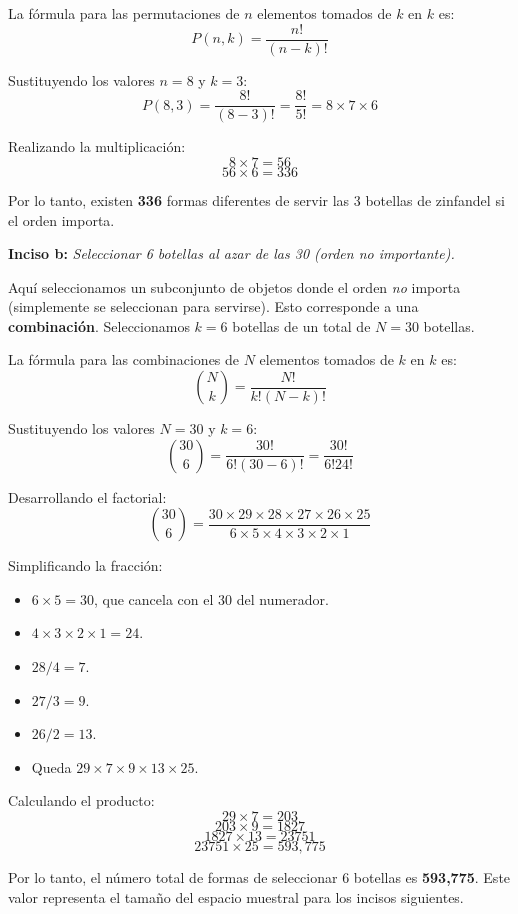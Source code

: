 \documentclass[a4paper]{article}
\begin{document}
La fórmula para las permutaciones de $n$ elementos tomados de $k$ en $k$ es:
$$ P(n, k) = \frac{n!}{(n-k)!} $$

Sustituyendo los valores $n=8$ y $k=3$:
$$ P(8, 3) = \frac{8!}{(8-3)!} = \frac{8!}{5!} = 8 \times 7 \times 6 $$

Realizando la multiplicación:
$$ 8 \times 7 = 56 $$
$$ 56 \times 6 = 336 $$

Por lo tanto, existen \textbf{336} formas diferentes de servir las 3 botellas de zinfandel si el orden importa.

\vspace{0.3cm}

\textbf{Inciso b:} \textit{Seleccionar 6 botellas al azar de las 30 (orden no importante).}

Aquí seleccionamos un subconjunto de objetos donde el orden \textit{no} importa (simplemente se seleccionan para servirse). Esto corresponde a una \textbf{combinación}. Seleccionamos $k=6$ botellas de un total de $N=30$ botellas.

La fórmula para las combinaciones de $N$ elementos tomados de $k$ en $k$ es:
$$ \binom{N}{k} = \frac{N!}{k!(N-k)!} $$

Sustituyendo los valores $N=30$ y $k=6$:
$$ \binom{30}{6} = \frac{30!}{6!(30-6)!} = \frac{30!}{6!24!} $$

Desarrollando el factorial:
$$ \binom{30}{6} = \frac{30 \times 29 \times 28 \times 27 \times 26 \times 25}{6 \times 5 \times 4 \times 3 \times 2 \times 1} $$

Simplificando la fracción:
\begin{itemize}
    \item $6 \times 5 = 30$, que cancela con el 30 del numerador.
    \item $4 \times 3 \times 2 \times 1 = 24$.
    \item $28 / 4 = 7$.
    \item $27 / 3 = 9$.
    \item $26 / 2 = 13$.
    \item Queda $29 \times 7 \times 9 \times 13 \times 25$.
\end{itemize}

Calculando el producto:
$$ 29 \times 7 = 203 $$
$$ 203 \times 9 = 1827 $$
$$ 1827 \times 13 = 23751 $$
$$ 23751 \times 25 = 593,775 $$

Por lo tanto, el número total de formas de seleccionar 6 botellas es \textbf{593,775}. Este valor representa el tamaño del espacio muestral para los incisos siguientes.
\end{document}
